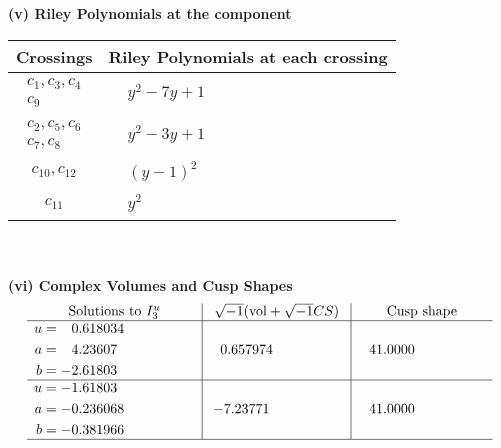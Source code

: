 \documentclass[1p]{elsarticle_modified}
\theoremstyle{definition}
\newcommand{\I}{\sqrt{-1}}
\begin{document}
\newpage\renewcommand{\arraystretch}{1}
\flushleft \textbf{(v) Riley Polynomials at the component}\newline \\
\begin{tabular}{m{50pt}|m{274pt}}
Crossings & \hspace{64pt}Riley Polynomials at each crossing \\
\hline $$\begin{aligned}c_{1},c_{3},c_{4}\\c_{9}\end{aligned}$$&$\begin{aligned}
&y^2-7 y+1
\end{aligned}$\\
\hline $$\begin{aligned}c_{2},c_{5},c_{6}\\c_{7},c_{8}\end{aligned}$$&$\begin{aligned}
&y^2-3 y+1
\end{aligned}$\\
\hline $$\begin{aligned}c_{10},c_{12}\end{aligned}$$&$\begin{aligned}
&(y-1)^2
\end{aligned}$\\
\hline $$\begin{aligned}c_{11}\end{aligned}$$&$\begin{aligned}
&y^2
\end{aligned}$\\
\hline
\end{tabular}\\~\\
\newpage\flushleft \textbf{(vi) Complex Volumes and Cusp Shapes}
$$\begin{array}{c|c|c}  
\text{Solutions to }I^u_{3}& \I (\text{vol} + \sqrt{-1}CS) & \text{Cusp shape}\\
 \hline 
\begin{aligned}
u &= \phantom{-}0.618034\phantom{ +0.000000I} \\
a &= \phantom{-}4.23607\phantom{ +0.000000I} \\
b &= -2.61803\phantom{ +0.000000I}\end{aligned}
 & \phantom{-}0.657974\phantom{ +0.000000I} & \phantom{-}41.0000\phantom{ +0.000000I} \\ \hline\begin{aligned}
u &= -1.61803\phantom{ +0.000000I} \\
a &= -0.236068\phantom{ +0.000000I} \\
b &= -0.381966\phantom{ +0.000000I}\end{aligned}
 & -7.23771\phantom{ +0.000000I} & \phantom{-}41.0000\phantom{ +0.000000I}\\
 \hline 
 \end{array}$$\newpage
\end{document}
